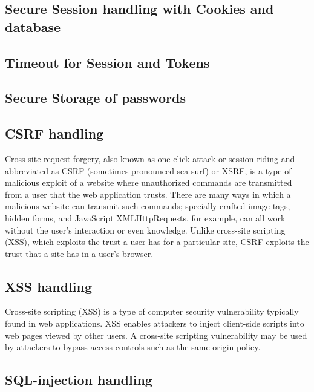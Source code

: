 \documentclass[12pt,a4paper]{article}
\begin{document}
		\subsection{Secure Session handling with Cookies and database}
		
		\subsection{Timeout for Session and Tokens}
		
		\subsection{Secure Storage of passwords}
		
		\subsection{CSRF handling}
		
			\begin{flushleft}
				Cross-site request forgery, also known as one-click attack or session riding and abbreviated as CSRF (sometimes pronounced sea-surf) or XSRF, is a type of malicious exploit of a website where unauthorized commands are transmitted from a user that the web application trusts. There are many ways in which a malicious website can transmit such commands; specially-crafted image tags, hidden forms, and JavaScript XMLHttpRequests, for example, can all work without the user's interaction or even knowledge. Unlike cross-site scripting (XSS), which exploits the trust a user has for a particular site, CSRF exploits the trust that a site has in a user's browser.
			\end{flushleft}
			
		\subsection{XSS handling}
		
			\begin{flushleft}
				Cross-site scripting (XSS) is a type of computer security vulnerability typically found in web applications. XSS enables attackers to inject client-side scripts into web pages viewed by other users. A cross-site scripting vulnerability may be used by attackers to bypass access controls such as the same-origin policy. 
			\end{flushleft}
			
		\subsection{SQL-injection handling}
		
\end{document}
